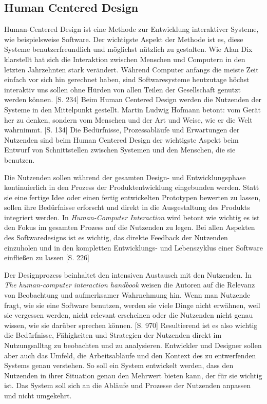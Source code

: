\documentclass[12pt]{article}
\begin{document}
\subsection{Human Centered Design}
Human-Centered Design ist eine Methode zur Entwicklung interaktiver Systeme,
wie beispielsweise Software. Der wichtigste Aspekt der Methode ist es, diese
Systeme benutzerfreundlich und möglichst nützlich zu gestalten. Wie Alan Dix
klarstellt hat sich die Interaktion zwischen Menschen und Computern in den
letzten Jahrzehnten stark verändert. Während Computer anfangs die meiste Zeit
einfach vor sich hin gerechnet haben, sind Softwaresysteme heutzutage höchst
interaktiv uns sollen ohne Hürden von allen Teilen der Gesellschaft genutzt
werden können. \cite{hci}[S. 234] Beim Human Centered Design werden die
Nutzenden der Systeme in den Mittelpunkt gestellt. Martin Ludwig Hofmann
betont:  vom Gerät her zu denken, sondern vom
Menschen und der Art und Weise, wie er die Welt wahrnimmt\grqq{}. \cite{hcd}[S.
    134] Die Bedürfnisse, Prozessabläufe und Erwartungen der Nutzenden sind beim
Human Centered Design der wichtigste Aspekt beim Entwurf von Schnittstellen
zwischen Systemen und den Menschen, die sie benutzen.

Die Nutzenden sollen während der gesamten Design- und Entwicklungsphase
kontinuierlich in den Prozess der Produktentwicklung eingebunden werden. Statt
sie eine fertige Idee oder einen fertig entwickelten Prototypen bewerten zu
lassen, sollen ihre Bedürfnisse erforscht und direkt in die Ausgestaltung des
Produkts integriert werden. In \textit{Human-Computer Interaction} wird betont
wie wichtig es ist den Fokus im gesamten Prozess auf die Nutzenden zu legen.
Bei allen Aspekten des Softwaredesigns ist es wichtig, das direkte Feedback der
Nutzenden einzuholen und in den kompletten Entwicklungs- und Lebenszyklus einer
Software einfließen zu lassen \cite{hci}[S. 226]

Der Designprozess beinhaltet den intensiven Austausch mit den Nutzenden. In
\textit{The human-computer interaction handbook} weisen die Autoren auf die
Relevanz von Beobachtung und aufmerksamer Wahrnehmung hin. Wenn man Nutzende
fragt, wie sie eine Software benutzen, werden sie viele Dinge nicht erwähnen,
weil sie vergessen werden, nicht relevant erscheinen oder die Nutzenden nicht
genau wissen, wie sie darüber sprechen können. \cite{hciHandbook}[S. 970]
Resultierend ist es also wichtig die Bedürfnisse, Fähigkeiten und Strategien
der Nutzenden direkt im Nutzungsalltag zu beobachten und zu analysieren.
Entwickler und Designer sollen aber auch das Umfeld, die Arbeitsabläufe und den
Kontext des zu entwerfenden Systems genau verstehen. So soll ein System
entwickelt werden, dass den Nutzenden in ihrer Situation genau den Mehrwert
bieten kann, der für sie wichtig ist. Das System soll sich an die Abläufe und
Prozesse der Nutzenden anpassen und nicht umgekehrt.
\end{document}
